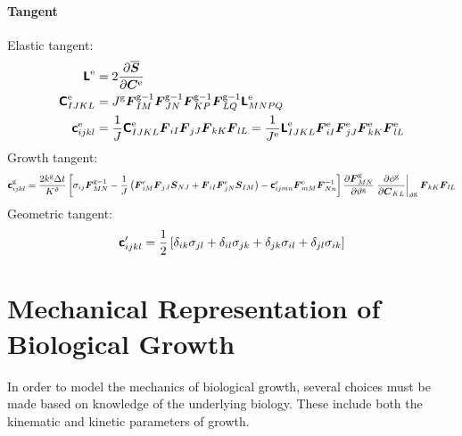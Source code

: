 \documentclass[10pt,letterpaper,oneside]{report}
\newcommand{\ten}[1]{\mbox{\boldmath $#1$}{}}
\newcommand{\tenf}[1]{\mbox{{\sffamily{\bfseries {#1}}}}}
\newcommand{\scas}[1]{\mbox{{\scriptsize{${\rm{#1}}$}}}{}}
\begin{document}
\subsubsection{Tangent}
Elastic tangent:
\begin{align}
\tenf{L}^{\scas{e}} ={}& 2 \frac{\partial \overline{\ten{S}}}{\partial \ten{C}^{\scas{e}}} 
\\
\tenf{C}^{\scas{e}}_{IJKL} ={}& J^{\scas{g}} \ten{F}^{\scas{g}-1}_{IM} \ten{F}^{\scas{g}-1}_{JN} \ten{F}^{\scas{g}-1}_{KP} \ten{F}^{\scas{g}-1}_{LQ} \tenf{L}^{\scas{e}}_{MNPQ} 
\\ 
\tenf{c}^{\scas{e}}_{ijkl} ={}& \frac{1}{J} \tenf{C}^{\scas{e}}_{IJKL} \ten{F}_{iI} \ten{F}_{jJ} \ten{F}_{kK} \ten{F}_{lL} = \frac{1}{J^{\scas{e}}} \tenf{L}^{\scas{e}}_{IJKL} \ten{F}^{\scas{e}}_{iI} \ten{F}^{\scas{e}}_{jJ} \ten{F}^{\scas{e}}_{kK} \ten{F}^{\scas{e}}_{lL} 
\end{align}
Growth tangent:
\begin{equation}
\tenf{c}^{\scas{g}}_{ijkl} = \frac{2 k^{\scas{g}} \Delta t}{K^\vartheta} \left[ \sigma_{ij} \ten{F}^{\scas{g}-1}_{MN} 
- \frac{1}{J} \left( \ten{F}^{\scas{e}}_{iM} \ten{F}_{jJ} \ten{S}_{NJ} + \ten{F}_{iI} \ten{F}^{\scas{e}}_{jN} \ten{S}_{IM} \right)
- \tenf{c}^{\scas{e}}_{ijmn} \ten{F}^{\scas{e}}_{mM} \ten{F}^{-1}_{Nn} \right] 
\frac{\partial \ten{F}^{\scas{g}}_{MN}}{\partial \vartheta^{\scas{g}}} \left. \frac{\partial \phi^{\scas{g}} }{\partial \ten{C}_{KL}} \right|_{\vartheta^{\scas{g}}} \ten{F}_{kK} \ten{F}_{lL} 
\end{equation}
Geometric tangent:
\begin{equation}
\tenf{c}'_{ijkl} = \frac{1}{2} \left[ \delta_{ik}\sigma_{jl} + \delta_{il}\sigma_{jk} + \delta_{jk}\sigma_{il} + \delta_{jl}\sigma_{ik} \right]  
\end{equation}


\chapter{Mechanical Representation of Biological Growth}
In order to model the mechanics of biological growth, several choices must be made based on knowledge of the underlying biology.  These include both the kinematic and kinetic parameters of growth.  

\end{document}
